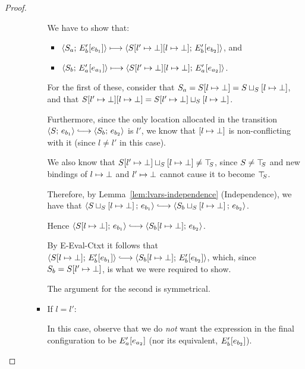 \begin{proof}
\begin{enumerate}
\begin{enumerate}
\begin{itemize}
        We have to show that:
        \begin{itemize}
        \item $\langle S_a;\, E'_b\hspace{-0.5mm}\left[e_{b_1}\right] \rangle \longmapsto
          \langle S[l' \mapsto \bot][l \mapsto \bot];\, E'_b\hspace{-0.5mm}\left[e_{b_2}\right] \rangle$,
          and
        \item $\langle S_b;\, E'_a\hspace{-0.5mm}\left[e_{a_1}\right] \rangle \longmapsto
          \langle S[l' \mapsto \bot][l \mapsto \bot];\, E'_a\hspace{-0.5mm}\left[e_{a_2}\right] \rangle$.
        \end{itemize}

        For the first of these, consider that $S_a =
        S[l \mapsto \bot] =
        S \sqcup_{S} \left[ l \mapsto \bot \right]$, and that
        $S[l' \mapsto \bot][l \mapsto \bot] =
        S[l' \mapsto \bot] \sqcup_{S} \left[ l \mapsto \bot \right]$.

        Furthermore, since the only location allocated in the
        transition $\config{S}{e_{b_1}} \parstepsto
        \config{S_b}{e_{b_2}}$ is $l'$, we know that
        $\left[ l \mapsto \bot \right]$ is non-conflicting with
        it (since $l \neq l'$ in this case).

        We also know that
        $S[l' \mapsto \bot] \sqcup_{S} \left[ l \mapsto \bot \right]
        \neq \top\hspace{-0.85mm}_{S}$, since $S \neq \top\hspace{-0.85mm}_{S}$ and new bindings of
        $l \mapsto \bot$ and $l' \mapsto \bot$
        cannot cause it to become $\top\hspace{-0.85mm}_{S}$.

        Therefore, by Lemma~\ref{lem:lvars-independence}
        (Independence), we have that
        $\config{\lubstore{S}{\store{\storebindingRaw{l}{\bot}}}}{e_{b_1}}
        \parstepsto
        \config{\lubstore{S_b}{\store{\storebindingRaw{l}{\bot}}}}{e_{b_2}}$.

        Hence $\config{\extSRaw{S}{l}{\bot}}{e_{b_1}} \parstepsto
        \config{\extSRaw{S_b}{l}{\bot}}{e_{b_2}}$.

        By {\sc E-Eval-Ctxt} it follows that
        $\config{\extSRaw{S}{l}{\bot}}{\evalctxt{E'_b}{e_{b_1}}}
        \parstepsto
        \config{\extSRaw{S_b}{l}{\bot}}{\evalctxt{E'_b}{e_{b_2}}}$,
        which, since $S_b = S[l' \mapsto \bot]$, is what we were
        required to show.

        The argument for the second is symmetrical.

      \item If $l = l'$:

        In this case, observe that we do \emph{not} want the
        expression in the final configuration to be
        $E'_a\hspace{-0.5mm}\left[e_{a_2}\right]$ (nor its equivalent,
        $E'_b\hspace{-0.5mm}\left[e_{b_2}\right]$).


\end{itemize}
\end{enumerate}
\end{enumerate}
\end{proof}
